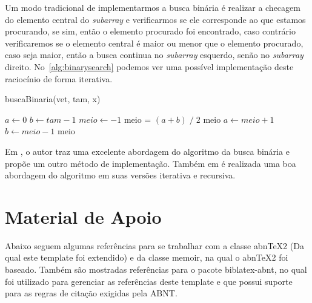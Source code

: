 \documentclass[
	12pt,    %
	oneside, %
	a4paper, %
	chapter=TITLE, %
	section=TITLE, %
	sumario=tradicional, %
	english, %
	brazil   %
] {abntex2}
\begin{document}
	Um modo tradicional de implementarmos a busca binária é realizar a checagem do elemento central do \textit{subarray} e verificarmos se ele corresponde ao que estamos procurando, se sim, então o elemento procurado foi encontrado, caso contrário verificaremos se o elemento central é maior ou menor que o elemento procurado, caso seja maior, então a busca continua no \textit{subarray} esquerdo, senão no \textit{subarray} direito. No~\autoref{alg:binarysearch} podemos ver uma possível implementação deste raciocínio de forma iterativa.
	
	\vspace{.5cm}		
	\begin{algorithm}[H]
		\linespread{1}\selectfont
		\caption{\textsf{buscaBinaria(vet, tam, x)}}
		\label{alg:binarysearch}			
		$a \gets 0$\;
		$b \gets tam - 1$\;
		$meio \gets -1$\;
		 {
			meio = $(a + b) \; / \; 2$\;
			 {
				\Retorna meio 
			} 
			 {
				$a \gets meio + 1$\;
			} {
				$b \gets meio - 1$\;
			}
		}
		\Retorna meio 		
	\end{algorithm}
	\vspace{.5cm}		

	Em \textcite{laaksonen2017}, o autor traz uma excelente abordagem do algoritmo da \textsf{busca binária} e propõe um outro método de implementação. Também em \cite{programizsite} é realizada uma boa abordagem do algoritmo em suas versões iterativa e recursiva.
	
	\chapter{Material de Apoio}\label{sec:materia-apoio}
	Abaixo seguem algumas referências para se trabalhar com a classe \textsf{abn\TeX 2} (Da qual este template foi extendido) e da classe \textsf{memoir}, na qual o \textsf{abn\TeX 2} foi baseado. Também são mostradas referências para o pacote \textsf{biblatex-abnt}, no qual foi utilizado para gerenciar as referências deste template e que possui suporte para as regras de citação exigidas pela ABNT. 
	
\end{document}
